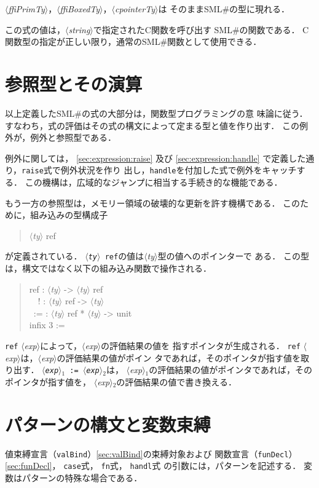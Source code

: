 \documentclass{jbook}
\newcommand{\txt}[2]{#1}
\newcommand{\smlsharp}{SML\#}
\newcommand{\code}[1]{\mbox{\large\tt #1}}
\newcommand{\nonterm}[1]{\mbox{$\langle$}{\it #1}\mbox{$\rangle$}}
\newcommand{\term}[1]{\mbox{{\tt #1}}}
\newenvironment{program}{\begin{quote}\begin{tt}}%
                        {\end{tt}\end{quote}}
\begin{document}
\nonterm{ffiPrimTy}，\nonterm{ffiBoxedTy}，\nonterm{cpointerTy}は
そのまま\smlsharp{}の型に現れる．

	この式の値は，\nonterm{string}で指定されたC関数を呼び出す
\smlsharp{}の関数である．
	C関数型の指定が正しい限り，通常の\smlsharp{}関数として使用できる．

\section{参照型とその演算}
\label{sec:ref}

	以上定義した\smlsharp{}の式の大部分は，関数型プログラミングの意
味論に従う．
	すなわち，式の評価はその式の構文によって定まる型と値を作り出す．
	この例外が，例外と参照型である．

	例外に関しては，
\ref{sec:expression:raise}
及び
\ref{sec:expression:handle}
で定義した通り，\term{raise}式で例外状況を作り
出し，\term{handle}を付加した式で例外をキャッチする．
	この機構は，広域的なジャンプに相当する手続き的な機能である．

	もう一方の参照型は，メモリー領域の破壊的な更新を許す機構である．
	このために，組み込みの型構成子
\begin{program}
\nonterm{ty} ref
\end{program}
が定義されている．
	\code{\nonterm{ty} ref}の値は\nonterm{ty}型の値へのポインターで
ある．
	この型は，構文ではなく以下の組み込み関数で操作される．
\begin{program}
ref : \nonterm{ty} -> \nonterm{ty} ref\\
\ \ ! : \nonterm{ty} ref -> \nonterm{ty}\\
\ :=  : \nonterm{ty} ref * \nonterm{ty}  -> unit\\
infix 3 :=
\end{program}
	\code{ref} \nonterm{exp}によって，\nonterm{exp}の評価結果の値を
指すポインタが生成される．
	\code{ref} \nonterm{exp}は，\nonterm{exp}の評価結果の値がポイン
タであれば，そのポインタが指す値を取り出す．
	\code{\nonterm{exp}$_1$ := \nonterm{exp}$_2$}は，
\nonterm{exp}$_1$の評価結果の値がポインタであれば，そのポインタが指す値を，
\nonterm{exp}$_2$の評価結果の値で書き換える．


\section{\txt{パターンの構文と変数束縛}{}}

	値束縛宣言（\code{valBind}）\ref{sec:valBind}の束縛対象および
関数宣言（\code{funDecl}）\ref{sec:funDecl}，
\code{case}式，
\code{fn}式，
\code{handl}式
の引数には，パターンを記述する．
	変数はパターンの特殊な場合である．
\end{document}
